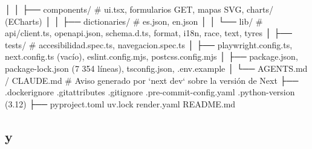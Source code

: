 \begin{codigo}
│   │   ├── components/        # ui.tsx, formularios GET, mapas SVG, charts/ (ECharts)
│   │   ├── dictionaries/      # es.json, en.json
│   │   └── lib/               # api/{client.ts, openapi.json, schema.d.ts}, format, i18n, race, text, tyres
│   ├── tests/                 # accesibilidad.spec.ts, navegacion.spec.ts
│   ├── playwright.config.ts, next.config.ts (vacío), eslint.config.mjs, postcss.config.mjs
│   ├── package.json, package-lock.json (7 354 líneas), tsconfig.json, .env.example
│   └── AGENTS.md / CLAUDE.md  # Aviso generado por `next dev` sobre la versión de Next
├── .dockerignore  .gitattributes  .gitignore  .pre-commit-config.yaml  .python-version (3.12)
├── pyproject.toml  uv.lock  render.yaml  README.md
\end{codigo}

\subsection{ y }

